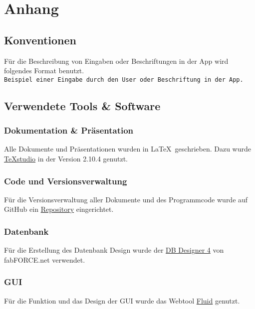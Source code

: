 \chapter{Anhang}

\section{Konventionen}

Für die Beschreibung von Eingaben oder Beschriftungen in der App wird folgendes Format benutzt. \\
{\color{IndianRed}\texttt{Beispiel einer Eingabe durch den User oder Beschriftung in der App.}}

\section{Verwendete Tools \& Software}

\subsection{Dokumentation \& Präsentation}

Alle Dokumente und Präsentationen wurden in \LaTeX \ geschrieben. Dazu wurde \href{http://texstudio.sourceforge.net}{TeXstudio} in der Version 2.10.4 genutzt. 

\subsection{Code und Versionsverwaltung}

Für die Versionsverwaltung aller Dokumente und des Programmcode wurde auf GitHub ein \href{https://github.com/MWeigert/Collector}{Repository} eingerichtet.

\subsection{Datenbank}

Für die Erstellung des Datenbank Design wurde der \href{http://fabforce.net/dbdesigner4/}{DB Designer 4} von fabFORCE.net verwendet.

\subsection{GUI}

Für die Funktion und das Design der GUI wurde das Webtool \href{https://www.fluidui.com}{Fluid} genutzt.

